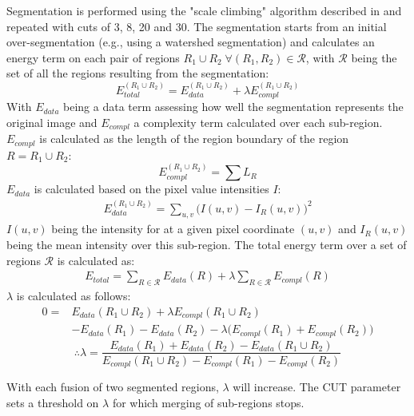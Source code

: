 \documentclass[10pt]{article}
\begin{document}
Segmentation is performed using the "scale climbing" algorithm described in \cite{guigues_scale-sets_2003} and repeated with cuts of 3, 8, 20 and 30. The segmentation starts from an initial over-segmentation (e.g., using a watershed segmentation) and calculates an energy term on each pair of regions $R_1\cup R_2\;\forall (R_1,R_2)\in\mathcal{R}$, with $\mathcal{R}$ being the set of all the regions resulting from the segmentation:
\begin{equation}
    E_{total}^{(R_1\cup R_2)}=E_{data}^{(R_1\cup R_2)}+\lambda E_{compl}^{(R_1\cup R_2)}
\end{equation}
With $E_{data}$ being a data term assessing how well the segmentation represents the original image and $E_{compl}$ a complexity term calculated over each sub-region. $E_{compl}$ is calculated as the length of the region boundary of the region $R=R_1\cup R_2$:
\begin{equation}
    E^{(R_1\cup R_2)}_{compl}=\sum L_R
\end{equation}
$E_{data}$ is calculated based on the pixel value intensities $I$:
\begin{align}
    E_{data}^{(R_1\cup R_2)}=\sum_{u,v}\big(I(u,v)-I_R(u,v)\big)^2
\end{align}
$I(u,v)$ being the intensity for at a given pixel coordinate $(u,v)$ and $I_R(u,v)$ being the mean intensity over this sub-region. The total energy term over a set of regions $\mathcal{R}$ is calculated as:
\begin{align}
    E_{total}=\sum_{R\in \mathcal{R}} E_{data}(R)+\lambda\sum_{R\in \mathcal{R}} E_{compl}(R)
\end{align}
$\lambda$ is calculated as follows:
\begin{equation}
    \begin{split}
    0=&E_{data}(R_1\cup R_2)+\lambda E_{compl}(R_1\cup R_2)\\
    &-E_{data}(R_1)-E_{data}(R_2)-\lambda\big(E_{compl}(R_1)+E_{compl}(R_2)\big)
    \end{split}
\end{equation}
\begin{equation}
    \therefore \lambda=\frac{E_{data}(R_1)+E_{data}(R_2)-E_{data}(R_1\cup R_2)}{E_{compl}(R_1\cup R_2) -E_{compl}(R_1)-E_{compl}(R_2)}
\end{equation}

With each fusion of two segmented regions, $\lambda$ will increase. The CUT parameter sets a threshold on $\lambda$ for which merging of sub-regions stops.
\end{document}
